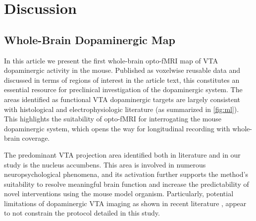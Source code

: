 \section{Discussion}

\subsection{Whole-Brain Dopaminergic Map}

In this article we present the first whole-brain opto-fMRI map of VTA dopaminergic activity in the mouse.
Published as voxelwise reusable data and discussed in terms of regions of interest in the article text, this constitutes an essential resource for preclinical investigation of the dopaminergic system.
The areas identified as functional VTA dopaminergic targets are largely consistent with histological and electrophysiologic literature (as summarized in \cref{fig:ml}).
This highlights the suitability of opto-fMRI for interrogating the mouse dopaminergic system, which opens the way for longitudinal recording with whole-brain coverage.

The predominant VTA projection area identified both in literature and in our study is the nucleus accumbens.
This area is involved in numerous neuropsychological phenomena, and its activation further supports the method's suitability to resolve meaningful brain function and increase the predictability of novel interventions using the mouse model organism.
Particularly, potential limitations of dopaminergic VTA imaging as shown in recent literature \cite{Brocka2018}, appear to not constrain the protocol detailed in this study.

